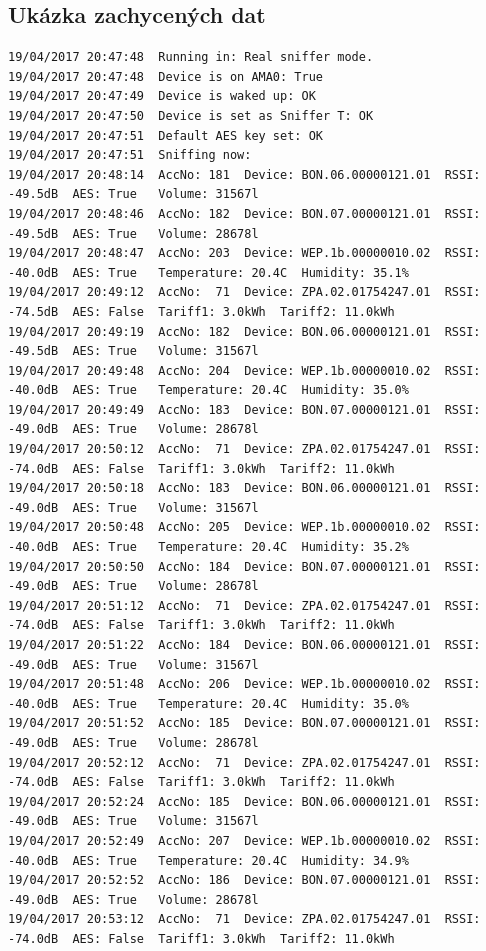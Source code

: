 \begin{landscape}
\chapter{Ukázka zachycených dat}
\label{PrilohaVystup}
	\begin{lstlisting}[style=MyCodeC]
19/04/2017 20:47:48  Running in: Real sniffer mode.
19/04/2017 20:47:48  Device is on AMA0: True
19/04/2017 20:47:49  Device is waked up: OK
19/04/2017 20:47:50  Device is set as Sniffer T: OK
19/04/2017 20:47:51  Default AES key set: OK
19/04/2017 20:47:51  Sniffing now:
19/04/2017 20:48:14  AccNo: 181  Device: BON.06.00000121.01  RSSI: -49.5dB  AES: True   Volume: 31567l 		
19/04/2017 20:48:46  AccNo: 182  Device: BON.07.00000121.01  RSSI: -49.5dB  AES: True   Volume: 28678l 
19/04/2017 20:48:47  AccNo: 203  Device: WEP.1b.00000010.02  RSSI: -40.0dB  AES: True   Temperature: 20.4C  Humidity: 35.1%
19/04/2017 20:49:12  AccNo:  71  Device: ZPA.02.01754247.01  RSSI: -74.5dB  AES: False  Tariff1: 3.0kWh  Tariff2: 11.0kWh
19/04/2017 20:49:19  AccNo: 182  Device: BON.06.00000121.01  RSSI: -49.5dB  AES: True   Volume: 31567l 
19/04/2017 20:49:48  AccNo: 204  Device: WEP.1b.00000010.02  RSSI: -40.0dB  AES: True   Temperature: 20.4C  Humidity: 35.0%		
19/04/2017 20:49:49  AccNo: 183  Device: BON.07.00000121.01  RSSI: -49.0dB  AES: True   Volume: 28678l
19/04/2017 20:50:12  AccNo:  71  Device: ZPA.02.01754247.01  RSSI: -74.0dB  AES: False  Tariff1: 3.0kWh  Tariff2: 11.0kWh
19/04/2017 20:50:18  AccNo: 183  Device: BON.06.00000121.01  RSSI: -49.0dB  AES: True   Volume: 31567l
19/04/2017 20:50:48  AccNo: 205  Device: WEP.1b.00000010.02  RSSI: -40.0dB  AES: True   Temperature: 20.4C  Humidity: 35.2%
19/04/2017 20:50:50  AccNo: 184  Device: BON.07.00000121.01  RSSI: -49.0dB  AES: True   Volume: 28678l
19/04/2017 20:51:12  AccNo:  71  Device: ZPA.02.01754247.01  RSSI: -74.0dB  AES: False  Tariff1: 3.0kWh  Tariff2: 11.0kWh
19/04/2017 20:51:22  AccNo: 184  Device: BON.06.00000121.01  RSSI: -49.0dB  AES: True   Volume: 31567l
19/04/2017 20:51:48  AccNo: 206  Device: WEP.1b.00000010.02  RSSI: -40.0dB  AES: True   Temperature: 20.4C  Humidity: 35.0%
19/04/2017 20:51:52  AccNo: 185  Device: BON.07.00000121.01  RSSI: -49.0dB  AES: True   Volume: 28678l
19/04/2017 20:52:12  AccNo:  71  Device: ZPA.02.01754247.01  RSSI: -74.0dB  AES: False  Tariff1: 3.0kWh  Tariff2: 11.0kWh
19/04/2017 20:52:24  AccNo: 185  Device: BON.06.00000121.01  RSSI: -49.0dB  AES: True   Volume: 31567l 
19/04/2017 20:52:49  AccNo: 207  Device: WEP.1b.00000010.02  RSSI: -40.0dB  AES: True   Temperature: 20.4C  Humidity: 34.9%
19/04/2017 20:52:52  AccNo: 186  Device: BON.07.00000121.01  RSSI: -49.0dB  AES: True   Volume: 28678l
19/04/2017 20:53:12  AccNo:  71  Device: ZPA.02.01754247.01  RSSI: -74.0dB  AES: False  Tariff1: 3.0kWh  Tariff2: 11.0kWh
	\end{lstlisting}
\end{landscape}
	
